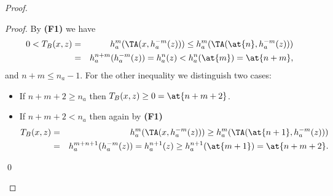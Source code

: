 \begin{proof}
\begin{itemize}
		\textit{Proof.} By {\bf (F1)} we have
		\begin{eqnarray*}
			0<T_B(x,z) &=& h_a^{m}(\TA(x,h_a^{-m}(z))) \leq h_a^{m}(\TA(\at{n},h_a^{-m}(z)))\\
			&=& h_a^{n+m}(h_a^{-m}(z))= h_a^{n}(z) < h_a^{n}(\at{m}) = \at{n+m},
		\end{eqnarray*}
		and $n+m \leq n_a-1$. For the other inequality we distinguish two cases:
		\begin{itemize}
			\item If $n+m+2 \geq n_a$ then  $T_B(x,z) \geq 0= \at{n+m+2}$.
			\item  If $n+m+2 < n_a$ then again by {\bf (F1)}
			\begin{eqnarray*}
				T_B(x,z) &=& h_a^{m}(\TA(x,h_a^{-m}(z))) \geq h_a^m (\TA(\at{n+1},h_a^{-m}(z)))\\
				&=& h_a^{m+n+1}(h_a^{-m}(z)) = h_a^{n+1}(z) \geq h_a^{n+1}(\at{m+1})=\at{n+m+2}.
			\end{eqnarray*}
		\end{itemize}
		\qed
	\end{itemize}
	

\end{proof}
